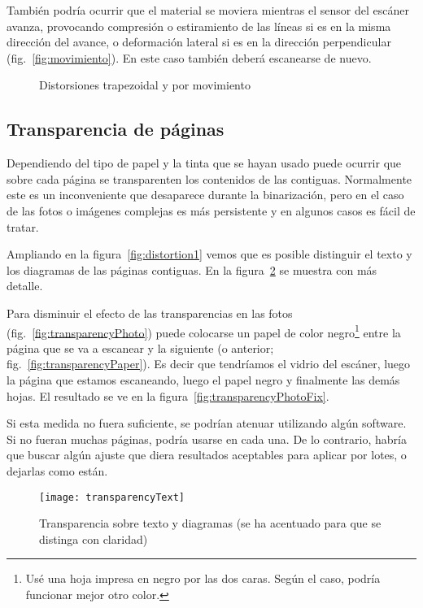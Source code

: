 \documentclass[%
	a5paper,
	10pt,
	twoside,
	openright,
	final,
]{memoir}
\begin{document}
{	También podría ocurrir que el material se moviera mientras el sensor del escáner avanza, provocando compresión o estiramiento de las líneas si es en la misma dirección del avance, o deformación lateral si es en la dirección perpendicular (fig.~\ref{fig:movimiento}). En este caso también deberá escanearse de nuevo.

	\begin{figure}
		\hfill
		\caption{Distorsiones trapezoidal y por movimiento\label{fig:distortion2}}
	\end{figure}

	\subsection{Transparencia de páginas\label{sec:transparency}} Dependiendo del tipo de papel y la tinta que se hayan usado puede ocurrir que sobre cada página se transparenten los contenidos de las contiguas. Normalmente este es un inconveniente que desaparece durante la binarización, pero en el caso de las fotos o imágenes complejas es más persistente y en algunos casos es fácil de tratar.

	Ampliando en la figura~\ref{fig:distortion1} vemos que es posible distinguir el texto y los diagramas de las páginas contiguas. En la figura~\ref{fig:transparencyText} se muestra con más detalle.

	Para disminuir el efecto de las transparencias en las fotos (fig.~\ref{fig:transparencyPhoto}) puede colocarse un papel de color negro\footnote{Usé una hoja impresa en negro por las dos caras. Según el caso, podría funcionar mejor otro color.} entre la página que se va a escanear y la siguiente (o anterior; fig.~\ref{fig:transparencyPaper}). Es decir que tendríamos el vidrio del escáner, luego la página que estamos escaneando, luego el papel negro y finalmente las demás hojas. El resultado se ve en la figura~\ref{fig:transparencyPhotoFix}.

	Si esta medida no fuera suficiente, se podrían atenuar utilizando algún software. Si no fueran muchas páginas, podría usarse \gimp en cada una. De lo contrario, habría que buscar algún ajuste que diera resultados aceptables para aplicar por lotes, o dejarlas como están.

	\begin{figure}
		\texttt{[image: transparencyText]}
		\caption[Transparencia sobre texto y diagramas]{Transparencia sobre texto y diagramas (se ha acentuado para que se distinga con claridad)\label{fig:transparencyText}}
	\end{figure}

}
\end{document}
